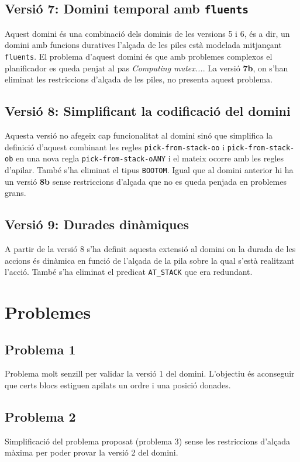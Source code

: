 \documentclass[10pt,a4paper]{article}
\begin{document}
\subsection*{Versió 7: Domini temporal amb \texttt{fluents}}
Aquest domini és una combinació dels dominis de les versions 5 i 6, és a dir, un domini amb funcions duratives
l'alçada de les piles està modelada mitjançant \texttt{fluents}. El problema d'aquest domini és que amb problemes
complexos el planificador es queda penjat al pas \textit{Computing mutex...}. La versió \textbf{7b}, on s'han eliminat
les restriccions d'alçada de les piles, no presenta aquest problema.

\subsection*{Versió 8: Simplificant la codificació del domini}
Aquesta versió no afegeix cap funcionalitat al domini sinó que simplifica la definició
d'aquest combinant les regles \texttt{pick-from-stack-oo} i \texttt{pick-from-stack-ob} en una nova regla \texttt{pick-from-stack-oANY}
i el mateix ocorre amb les regles d'apilar. També s'ha eliminat el tipus \texttt{BOOTOM}. Igual que al domini anterior hi ha un versió
\textbf{8b} sense restriccions d'alçada que no es queda penjada en problemes grans.

\subsection*{Versió 9: Durades dinàmiques}
A partir de la versió 8 s'ha definit aquesta extensió al domini on la durada de les accions és dinàmica en
funció de l'alçada de la pila sobre la qual s'està realitzant l'acció. També s'ha eliminat el predicat \texttt{AT\_STACK} que era redundant.


\section*{Problemes}

\subsection*{Problema 1}
Problema molt senzill per validar la versió 1 del domini. L'objectiu és aconseguir que certs blocs estiguen
apilats un ordre i una posició donades.

\subsection*{Problema 2}
Simplificació del problema proposat (problema 3) sense les restriccions d'alçada màxima per poder provar la versió 2 del domini.
\end{document}

